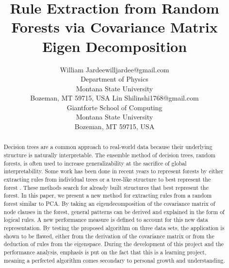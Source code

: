 \documentclass[11pt]{article}
\begin{document}
\title{Rule Extraction from Random Forests via Covariance Matrix Eigen Decomposition}

\author{\name William Jardee\email willjardee@gmail.com \\
       \addr Department of Physics\\
       Montana State University\\
       Bozeman, MT 59715, USA\AND
       \name Lin Shi\email linshi1768@gmail.com\\
       \addr Giantforte School of Computing\\
       Montana State University\\
       Bozeman, MT 59715, USA
       }

\maketitle

\begin{abstract}%
\begin{small}
Decision trees are a common approach to real-world data because their underlying structure is naturally interpretable. The ensemble method of decision trees, random forests, is often used to increase generalizability at the sacrifice of global interpretability. Some work has been done in recent years to represent forests by either extracting rules from individual trees \citep{benard2021interpretable, mashayekhi2015rule} or a tree-like structure to best represent the forest \citep{boruah2022transparent, vidal2020born}. These methods search for already built structures that best represent the forest. In this paper, we present a new method for extracting rules from a random forest similar to PCA. By taking an eigendecomposition of the covariance matrix of node clauses in the forest, general patterns can be derived and explained in the form of logical rules. A new performance measure is defined to account for this new data representation. By testing the proposed algorithm on three data sets, the application is shown to be flawed, either from the derivation of the covariance matrix or from the deduction of rules from the eigenspace. During the development of this project and the performance analysis, emphasis is put on the fact that this is a learning project, meaning a perfected algorithm comes secondary to personal growth and understanding. 
\end{small}
\end{abstract}
 
\end{document}
